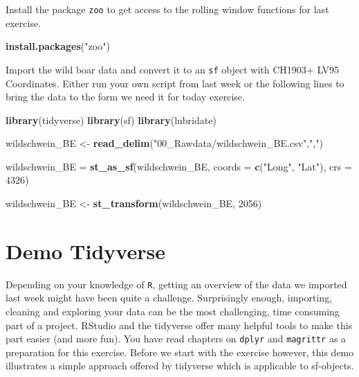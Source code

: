\documentclass[]{book}
\newenvironment{Shaded}{\begin{snugshade}}{\end{snugshade}}
\newcommand{\KeywordTok}[1]{\textcolor[rgb]{0.13,0.29,0.53}{\textbf{#1}}}
\newcommand{\DataTypeTok}[1]{\textcolor[rgb]{0.13,0.29,0.53}{#1}}
\newcommand{\DecValTok}[1]{\textcolor[rgb]{0.00,0.00,0.81}{#1}}
\newcommand{\StringTok}[1]{\textcolor[rgb]{0.31,0.60,0.02}{#1}}
\newcommand{\NormalTok}[1]{#1}
\begin{document}
Install the package \texttt{zoo} to get access to the rolling window
functions for last exercise.

\begin{Shaded}
\begin{Highlighting}[]
\KeywordTok{install.packages}\NormalTok{(}\StringTok{"zoo"}\NormalTok{)}
\end{Highlighting}
\end{Shaded}

Import the wild boar data and convert it to an \texttt{sf} object with
CH1903+ LV95 Coordinates. Either run your own script from last week or
the following lines to bring the data to the form we need it for today
exercise.

\begin{Shaded}
\begin{Highlighting}[]
\KeywordTok{library}\NormalTok{(tidyverse)}
\KeywordTok{library}\NormalTok{(sf)}
\KeywordTok{library}\NormalTok{(lubridate)}

\NormalTok{wildschwein_BE <-}\StringTok{ }\KeywordTok{read_delim}\NormalTok{(}\StringTok{"00_Rawdata/wildschwein_BE.csv"}\NormalTok{,}\StringTok{","}\NormalTok{)}

\NormalTok{wildschwein_BE =}\StringTok{ }\KeywordTok{st_as_sf}\NormalTok{(wildschwein_BE, }\DataTypeTok{coords =} \KeywordTok{c}\NormalTok{(}\StringTok{"Long"}\NormalTok{, }\StringTok{"Lat"}\NormalTok{), }\DataTypeTok{crs =} \DecValTok{4326}\NormalTok{)}

\NormalTok{wildschwein_BE <-}\StringTok{ }\KeywordTok{st_transform}\NormalTok{(wildschwein_BE, }\DecValTok{2056}\NormalTok{)}
\end{Highlighting}
\end{Shaded}

\section{Demo Tidyverse}\label{demo-tidyverse}

Depending on your knowledge of \texttt{R}, getting an overview of the
data we imported last week might have been quite a challenge.
Surprisingly enough, importing, cleaning and exploring your data can be
the most challenging, time consuming part of a project. RStudio and the
tidyverse offer many helpful tools to make this part easier (and more
fun). You have read chapters on \texttt{dplyr} and \texttt{magrittr} as
a preparation for this exercise. Before we start with the exercise
however, this demo illustrates a simple approach offered by tidyverse
which is applicable to sf-objects.
\end{document}
